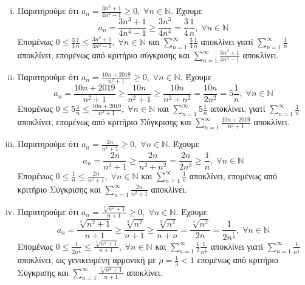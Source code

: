 \begin{enumerate}
\begin{enumerate}[i)]
        \item Παρατηρούμε ότι $ a_{n} = \frac{3n^{3}+1}{4n^{4}-1} \geq 0, \; \forall n 
            \in \mathbb{N} $. Έχουμε
            \[
                a_{n} = \frac{3n^{3}+1}{4n^{4}-1} \geq \frac{3n^{3}}{4n^{4}} = 
                \frac{3}{4} \frac{1}{n}, \; \forall n \in \mathbb{N} 
            \] 
            Επομένως $ 0 \leq \frac{3}{4} \frac{1}{n} \leq \frac{3n^{3}+1}{4n^{3}-1}, 
            \; \forall n \in \mathbb{N} $ και $ \sum_{n=1}^{\infty} \frac{3}{4} 
            \frac{1}{n} $ αποκλίνει γιατί $ \sum_{n=1}^{\infty} \frac{1}{n} $ 
            αποκλίνει, επομένως από κριτήριο σύγκρισης και $ \sum_{n=1}^{\infty} 
            \frac{3n^{3}+1}{4n^{4}-1} $ αποκλίνει.

        \item Παρατηρούμε ότι $ a_{n} = \frac{10n+2019}{n^{2}+1} \geq 0, \; 
            \forall n \in \mathbb{N} $. Έχουμε
            \[
                a_{n} = \frac{10n+2019}{n^{2}+1} \geq \frac{10n}{n^{2}+1} \geq 
                \frac{10n}{n^{2}+n^{2}} = \frac{10n}{2n^{2}} = 5 \frac{1}{n}, \; 
                \forall n \in \mathbb{N}
            \] 
            Επομένως $ 0 \leq 5 \frac{1}{n} \leq \frac{10n+2019}{n^{2}+1}, \; 
            \forall n \in \mathbb{N} $ και $ \sum_{n=1}^{\infty} 5 \frac{1}{n} $ 
            αποκλίνει, γιατί $ \sum_{n=1}^{\infty} \frac{1}{n} $ αποκλίνει, 
            επομένως από κριτήριο Σύγκρισης και $ \sum_{n=1}^{\infty} 
            \frac{10n +2019}{n^{2}+1} $ αποκλίνει.

        \item Παρατηρούμε ότι $ a_{n} = \frac{2n}{n^{2}+1} \geq 0, \; \forall n \in 
            \mathbb{N} $.  Έχουμε 
            \[
                a_{n} = \frac{2n}{n^{2}+1} \geq \frac{2n}{n^{2}+n^{2}} = 
                \frac{2n}{2n^{2}} \geq \frac{1}{n}, \; \forall n \in \mathbb{N} 
            \] 
            Επομένως $ 0 \leq \frac{1}{n} \leq \frac{2n}{n^{2}+1}, \; 
            \forall n \in \mathbb{N} $ και $ \sum_{n=1}^{\infty} \frac{1}{n} $ 
            αποκλίνει, επομένως από κριτήριο Σύγκρισης και $ \sum_{n=1}^{\infty} 
            \frac{2n}{n^{2}+1} $ αποκλίνει.

        \item Παρατηρούμε ότι $ a_{n} = \frac{\sqrt[3]{n^{2}+1}}{n+1} \geq 0, \; 
            \forall n \in \mathbb{N} $. Έχουμε
            \[
                a_{n} = \frac{\sqrt[3]{n^{2}+1}}{n+1} \geq \frac{\sqrt[3]{n^{2}}}{n+1} 
                \geq \frac{\sqrt[3]{n^{2}}}{n+n} = \frac{\sqrt[3]{n^{2}}}{2n} =
                \frac{1}{2n^{\frac{1}{3}}}, \; \forall n \in \mathbb{N}
            \] 
            Επομένως $ 0 \leq \frac{1}{2n^{\frac{1}{3}}} \leq 
            \frac{\sqrt[3]{n^{2}+1} }{n+1}, \; \forall n \in \mathbb{N} $ και 
            $ \sum_{n=1}^{\infty} \frac{1}{2} \frac{1}{n^{\frac{1}{3}}} $ 
            αποκλίνει γιατί $ \sum_{n=1}^{\infty} \frac{1}{n^{\frac{1}{3}}} $ 
            αποκλίνει, ως γενικευμένη αρμονική με $ \rho = \frac{1}{3} < 1 $ 
            επομένως από κριτήριο Σύγκρισης και $ \sum_{n=1}^{\infty} 
            \frac{\sqrt[3]{n^{2}+1}}{n+1} $ αποκλίνει.


\end{enumerate}
\end{enumerate}
